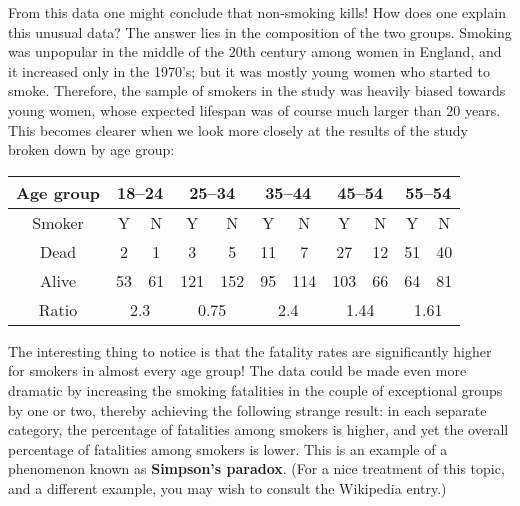 \documentclass[11pt,fleqn]{article}
\begin{document}
From this data one might conclude that non-smoking kills!
How does one explain this unusual data? The answer lies
in the composition of the two groups.
Smoking was unpopular in the middle of the 20th century
among women in England, and it increased only in the 1970's;
but it was mostly young women who started to smoke. 
Therefore, the sample of smokers in the study was heavily 
biased towards young women, whose expected lifespan was of
course much larger than $20$ years. This becomes clearer when 
we look more closely at the results of the study broken
down by age group:

\begin{center}
\begin{tabular}{|c|c|c|c|c|c|c|c|c|c|c|}
  \hline
  Age group & \multicolumn{2}{|c|}{18--24} & \multicolumn{2}{|c|}{25--34} & \multicolumn{2}{|c|}{35--44} & \multicolumn{2}{|c|}{45--54} & \multicolumn{2}{|c|}{55--54}\\ \hline
  Smoker & Y & N & Y & N & Y & N & Y & N & Y & N \\ \hline \hline
  Dead & 2 & 1 & 3 & 5 & 11 & 7 & 27 & 12 & 51 & 40 \\
  Alive & 53 & 61 & 121 & 152 & 95 & 114 & 103 & 66 & 64 & 81 \\\hline
  Ratio & \multicolumn{2}{|c|}{2.3}& \multicolumn{2}{|c|}{0.75} & \multicolumn{2}{|c|}{2.4}& \multicolumn{2}{|c|}{1.44} & \multicolumn{2}{|c|}{1.61}\\
  \hline
\end{tabular}
\end{center}

The interesting thing to notice is that the fatality rates are 
significantly higher for smokers in almost every age group!
The data could be made even more dramatic by increasing the 
smoking fatalities in the couple of exceptional groups by 
one or two, thereby achieving the following strange result:
in each separate category, the percentage of fatalities among
smokers is higher, and yet the overall percentage of fatalities
among smokers is lower.  
This is an example of a phenomenon known as  \textbf{Simpson's paradox}.
(For a nice treatment of this topic, and a different example, 
you may wish to consult the Wikipedia entry.)
\end{document}
